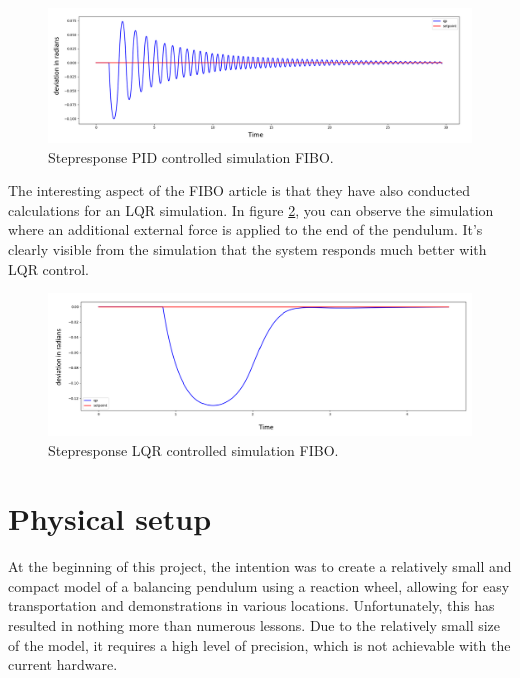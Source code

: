 \documentclass{article}
\begin{document}
\begin{multicols}{2}
\begin{figure}[H]
\centering
\includegraphics[scale=0.37]{Stepresponse FIBO}
\caption{Stepresponse PID controlled simulation FIBO.}
\label{fig:Stepresponse PID controlled simulation FIBO}
\end{figure}


The interesting aspect of the FIBO article is that they have also conducted calculations for an LQR simulation. In figure \ref{fig:Stepresponse LQR controlled simulation FIBO}, you can observe the simulation where an additional external force is applied to the end of the pendulum. It's clearly visible from the simulation that the system responds much better with LQR control.

\begin{figure}[H]
\centering
\includegraphics[scale=0.37]{Stepresponse FIBO LQR}
\caption{Stepresponse LQR controlled simulation FIBO.}
\label{fig:Stepresponse LQR controlled simulation FIBO}
\end{figure}

\section{Physical setup}
At the beginning of this project, the intention was to create a relatively small and compact model of a balancing pendulum using a reaction wheel, allowing for easy transportation and demonstrations in various locations. Unfortunately, this has resulted in nothing more than numerous lessons. Due to the relatively small size of the model, it requires a high level of precision, which is not achievable with the current hardware.


\end{multicols}
\end{document}
